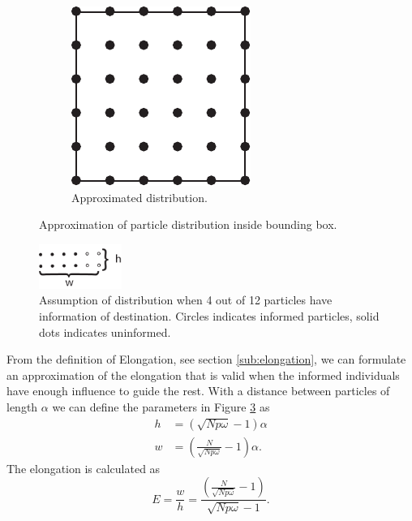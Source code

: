 \begin{figure}[H]
\begin{subfigure}[b]{\figwidth}
		\includegraphics[width=\textwidth]{img/Square.pdf}
		\caption{Approximated distribution.}
		\label{fig:distr_approx}
	\end{subfigure}
	\caption{Approximation of particle distribution inside bounding box.}
	\label{fig:distr}
\end{figure}

\begin{figure}[H]
	\centering
	\includegraphics[width=0.24\textwidth]{img/heightwidth.pdf}
	\caption{Assumption of distribution when 4 out of 12 particles have information of destination. Circles indicates informed particles, solid dots indicates uninformed.}
	\label{fig:distr_direction}
\end{figure}
From the definition of Elongation, see section \ref{sub:elongation}, we can formulate an approximation of the elongation that is valid when the informed individuals have enough influence to guide the rest. 
With a distance between particles of length $\alpha$ we can define the parameters in Figure \ref{fig:distr_direction} as
\begin{align}
	h &= (\sqrt{Np\omega}-1)\alpha \\
	w & = (\frac{N}{\sqrt{Np\omega}} -1) \alpha.
\end{align}
The elongation is calculated as 
\begin{equation}
	E = \frac{w}{h} = \frac{(\frac{N}{\sqrt{Np\omega}} -1)}{\sqrt{Np\omega}-1}.
\end{equation}
